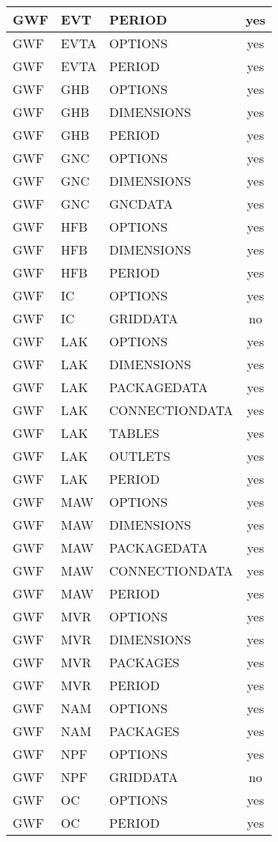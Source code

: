 \begin{longtable}{p{1.5cm} p{1.5cm} p{3cm} c}
GWF & EVT & PERIOD & yes \\ 
\hline
GWF & EVTA & OPTIONS & yes \\ 
GWF & EVTA & PERIOD & yes \\ 
\hline
GWF & GHB & OPTIONS & yes \\ 
GWF & GHB & DIMENSIONS & yes \\ 
GWF & GHB & PERIOD & yes \\ 
\hline
GWF & GNC & OPTIONS & yes \\ 
GWF & GNC & DIMENSIONS & yes \\ 
GWF & GNC & GNCDATA & yes \\ 
\hline
GWF & HFB & OPTIONS & yes \\ 
GWF & HFB & DIMENSIONS & yes \\ 
GWF & HFB & PERIOD & yes \\ 
\hline
GWF & IC & OPTIONS & yes \\ 
GWF & IC & GRIDDATA & no \\ 
\hline
GWF & LAK & OPTIONS & yes \\ 
GWF & LAK & DIMENSIONS & yes \\ 
GWF & LAK & PACKAGEDATA & yes \\ 
GWF & LAK & CONNECTIONDATA & yes \\ 
GWF & LAK & TABLES & yes \\ 
GWF & LAK & OUTLETS & yes \\ 
GWF & LAK & PERIOD & yes \\ 
\hline
GWF & MAW & OPTIONS & yes \\ 
GWF & MAW & DIMENSIONS & yes \\ 
GWF & MAW & PACKAGEDATA & yes \\ 
GWF & MAW & CONNECTIONDATA & yes \\ 
GWF & MAW & PERIOD & yes \\ 
\hline
GWF & MVR & OPTIONS & yes \\ 
GWF & MVR & DIMENSIONS & yes \\ 
GWF & MVR & PACKAGES & yes \\ 
GWF & MVR & PERIOD & yes \\ 
\hline
GWF & NAM & OPTIONS & yes \\ 
GWF & NAM & PACKAGES & yes \\ 
\hline
GWF & NPF & OPTIONS & yes \\ 
GWF & NPF & GRIDDATA & no \\ 
\hline
GWF & OC & OPTIONS & yes \\ 
GWF & OC & PERIOD & yes \\ 

\end{longtable}

